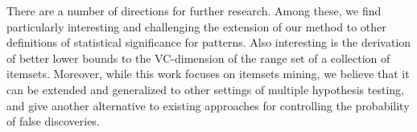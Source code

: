 There are a number of directions for further research. Among these, we find
particularly interesting and challenging the extension of our method to other
definitions of statistical significance for patterns. %
Also interesting is the derivation of better lower bounds to the VC-dimension
of the range set of a collection of itemsets. Moreover, while this work focuses
on itemsets mining, we believe that it can be extended and generalized to other
settings of multiple hypothesis testing, and give another alternative to existing
approaches for controlling the probability of false discoveries. %


